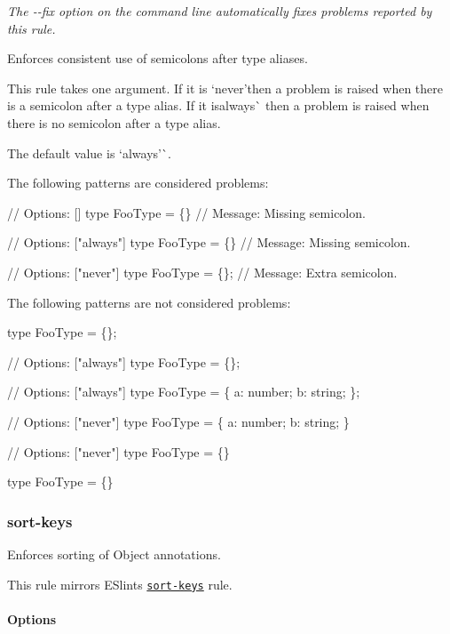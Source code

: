 {\itshape The {\ttfamily -\/-\/fix} option on the command line automatically fixes problems reported by this rule.}

Enforces consistent use of semicolons after type aliases.

This rule takes one argument. If it is `\textquotesingle{}never'{\ttfamily then a problem is raised when there is a semicolon after a type alias. If it is}\textquotesingle{}always\textquotesingle{}\`{} then a problem is raised when there is no semicolon after a type alias.

The default value is `\textquotesingle{}always'\`{}.

The following patterns are considered problems\+:


\begin{DoxyCode}
// Options: []
type FooType = \{\}
// Message: Missing semicolon.

// Options: ["always"]
type FooType = \{\}
// Message: Missing semicolon.

// Options: ["never"]
type FooType = \{\};
// Message: Extra semicolon.
\end{DoxyCode}


The following patterns are not considered problems\+:


\begin{DoxyCode}
type FooType = \{\};

// Options: ["always"]
type FooType = \{\};

// Options: ["always"]
type FooType = \{ a: number;
 b: string;
 \};

// Options: ["never"]
type FooType = \{ a: number;
 b: string;
 \}

// Options: ["never"]
type FooType = \{\}

type FooType = \{\}
\end{DoxyCode}


\label{_eslint-plugin-flowtype-rules-sort-keys}%
 \subsubsection*{{\ttfamily sort-\/keys}}

Enforces sorting of Object annotations.

This rule mirrors E\+Slint\textquotesingle{}s \href{http://eslint.org/docs/rules/sort-keys}{\tt sort-\/keys} rule.

\label{_eslint-plugin-flowtype-rules-sort-keys-options}%
 \paragraph*{Options}

